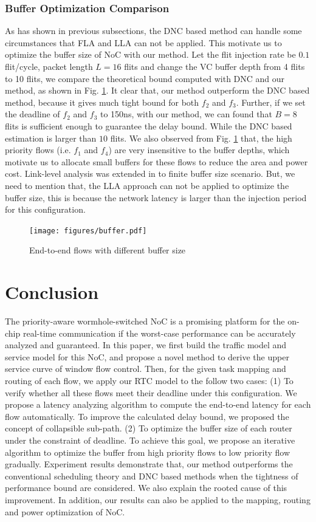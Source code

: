 \documentclass[10pt,journal]{IEEEtran}
\begin{document}
\subsubsection{Buffer Optimization Comparison}
As has shown in previous subsections, the DNC based method \cite{Qian489900} can handle some circumstances that FLA and LLA can not be applied. This motivate us to optimize the buffer size of NoC with our method. Let the flit injection rate be $0.1$ flit/cycle, packet length $L=16$ flits and change the VC buffer depth from 4 flits to 10 flits, we compare the theoretical bound computed with DNC and our method, as shown in Fig. \ref{buffer}. It clear that, our method outperform the DNC based method, because it gives much tight bound for both $f_2$ and $f_3$. Further, if we set the deadline of $f_2$ and $f_3$ to 150ns, with our method, we can found that $B=8$ flits is sufficient enough to guarantee the delay bound. While the DNC based estimation is larger than $10$ flits. We also observed from Fig. \ref{buffer} that, the high priority flows (i.e. $f_1$ and $f_4$) are very insensitive to the buffer depths, which motivate us to allocate small buffers for these flows to reduce the area and power cost. Link-level analysis was extended in \cite{189} to finite buffer size scenario. But, we need to mention that, the LLA approach can not be applied to optimize the buffer size, this is because the network latency is larger than the injection period for this configuration.
\begin{figure}
  \centering
  \texttt{[image: figures/buffer.pdf]}\\
  \caption{End-to-end flows with different buffer size}\label{buffer}
\end{figure}

\section{Conclusion}\label{conclusion}
The priority-aware wormhole-switched NoC is a promising platform for the on-chip real-time communication if the worst-case performance can be accurately analyzed and guaranteed. In this paper, we first build the traffic model and service model for this NoC, and propose a novel method to derive the upper service curve of window flow control. Then, for the given task mapping and routing of each flow, we apply our RTC model to the follow two cases: (1) To verify whether all these flows meet their deadline under this configuration. We propose a latency analyzing algorithm to compute the end-to-end latency for each flow automatically. To improve the calculated delay bound, we proposed the concept of collapsible sub-path. (2) To optimize the buffer size of each router under the constraint of deadline. To achieve this goal, we propose an iterative algorithm to optimize the buffer from high priority flows to low priority flow gradually. Experiment results demonstrate that, our method outperforms the conventional scheduling theory and DNC based methods when the tightness of performance bound are considered. We also explain the rooted cause of this improvement. In addition, our results can also be applied to the mapping, routing and power optimization of NoC.
\end{document}
